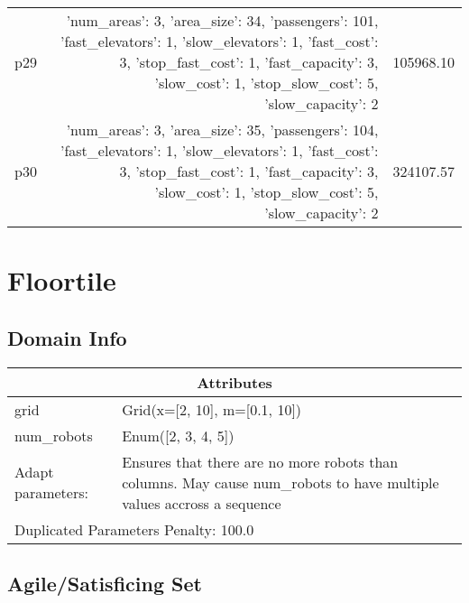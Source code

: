 \documentclass{article}
\begin{document}
\begin{center}
\begin{tabular}{@{}l|r|r@{}}
  p29&{'num\_areas': 3, 'area\_size': 34, 'passengers': 101, 'fast\_elevators': 1, 'slow\_elevators': 1, 'fast\_cost': 3, 'stop\_fast\_cost': 1, 'fast\_capacity': 3, 'slow\_cost': 1, 'stop\_slow\_cost': 5, 'slow\_capacity': 2}&105968.10\\
  p30&{'num\_areas': 3, 'area\_size': 35, 'passengers': 104, 'fast\_elevators': 1, 'slow\_elevators': 1, 'fast\_cost': 3, 'stop\_fast\_cost': 1, 'fast\_capacity': 3, 'slow\_cost': 1, 'stop\_slow\_cost': 5, 'slow\_capacity': 2}&324107.57
                            \end{tabular}
                            \end{center}
                    
                            \newpage \section{Floortile}
                    \subsection*{Domain Info}

                    \begin{center}
                    \begin{tabular}{@{}p{}p{}@{}}
                    \multicolumn{2}{c}{\bf \large Attributes}\\\midrule
                    grid & Grid(x=[2, 10], m=[0.1, 10])\\
num\_robots & Enum([2, 3, 4, 5])
                    
                    \\\midrule
                    Adapt parameters: & Ensures that there are no more robots than columns. May cause num\_robots to have multiple values accross a sequence
                
                     \\\midrule
                    \multicolumn{2}{l}{Duplicated Parameters Penalty: 100.0}
                    \end{tabular}
                    \end{center}
                
                         \subsection*{Agile/Satisficing Set}
\end{document}
